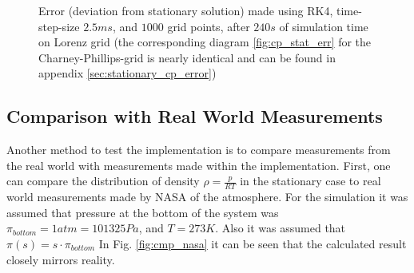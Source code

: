 \begin{figure}[!h]
    \caption{Error (deviation from stationary solution) made using RK4, time-step-size $2.5ms$, and $1000$ grid points, after $240s$ of simulation time on Lorenz grid (the corresponding diagram \ref{fig:cp_stat_err} for the Charney-Phillips-grid is nearly identical and can be found in appendix \ref{sec:stationary_cp_error})}
    \label{fig:lorenz_stat_err}
\end{figure}

\subsection{Comparison with Real World Measurements}
Another method to test the implementation is to compare measurements from the real world with measurements made within the implementation.
First, one can compare the distribution of density $\rho=\frac{p}{RT}$ in the stationary case to real world measurements made by NASA \cite{larson1963stratosphere} of the atmosphere.
For the simulation it was assumed that pressure at the bottom of the system was $\pi_{bottom}=1atm=101325 Pa$, and $T=273K$.
Also it was assumed that $\pi (s) = s\cdot\pi_{bottom}$
In Fig. \ref{fig:cmp_nasa} it can be seen that the calculated result closely mirrors reality.


